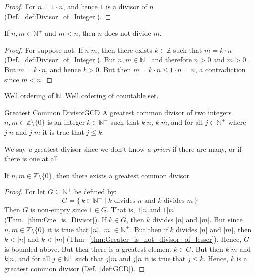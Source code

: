     \begin{proof}
        For $n=1\cdot{n}$, and hence $1$ is a divisor of $n$
        (Def.~\ref{def:Divisor_of_Integer}).
    \end{proof}
    \begin{theorem}
        \label{thm:Greater_is_not_divisor_of_lesser}%
        If $n,m\in\mathbb{N}^{+}$ and $m<n$, then $n$ does not divide
        $m$.
    \end{theorem}
    \begin{proof}
        For suppose not. If $n|m$, then there exists $k\in\mathbb{Z}$
        such that $m=k\cdot{n}$ (Def.~\ref{def:Divisor_of_Integer}). But
        $n,m\in\mathbb{N}^{+}$ and therefore $n>0$ and $m>0$. But
        $m=k\cdot{n}$, and hence $k>0$. But then
        $m=k\cdot{n}\leq{1}\cdot{n}=n$, a contradiction since $m<n$.
    \end{proof}
    Well ordering of $\mathbb{N}$. Well ordering of countable set.
    \begin{fdefinition}{Greatest Common Divisor}{GCD}
        A greatest common divisor of two integers
        $n,m\in\mathbb{Z}\setminus\{0\}$ is an integer
        $k\in\mathbb{N}^{+}$ such that $k|n$, $k|m$, and for all
        $j\in\mathbb{N}^{+}$ where $j|n$ and $j|m$ it is true that
        $j\leq{k}$.
    \end{fdefinition}
    We say \textit{a} greatest divisor since we don't know
    \textit{a priori} if there are many, or if there is one at all.
    \begin{theorem}
        \label{thm:GCD_Existence_Theorem}%
        If $n,m\in\mathbb{Z}\setminus\{0\}$, then there exists a
        greatest common divisor.
    \end{theorem}
    \begin{proof}
        For let $G\subseteq\mathbb{N}^{+}$ be defined by:
        \begin{equation}
            G=\{\,k\in\mathbb{N}^{+}\;|\;
                k\textrm{ divides }n\textrm{ and }
                k\textrm{ divides }m\,\}
        \end{equation}
        Then $G$ is non-empty since $1\in{G}$. That is, $1|n$ and $1|m$
        (Thm.~\ref{thm:One_is_Divisor}). If $k\in{G}$, then
        $k$ divides $|n|$ and $|m|$. But since
        $n,m\in\mathbb{Z}\setminus\{0\}$ it is true that
        $|n|,|m|\in\mathbb{N}^{+}$. But then if $k$ divides $|n|$ and $|m|$,
        then $k<|n|$ and $k<|m|$
        (Thm.~\ref{thm:Greater_is_not_divisor_of_lesser}). Hence, $G$ is
        bounded above. But then there is a greatest element $k\in{G}$.
        But then $k|m$ and $k|n$, and for all $j\in\mathbb{N}^{+}$ such
        that $j|m$ and $j|n$ it is true that $j\leq{k}$. Hence, $k$ is
        a greatest common divisor (Def.~\ref{def:GCD}).
    \end{proof}

